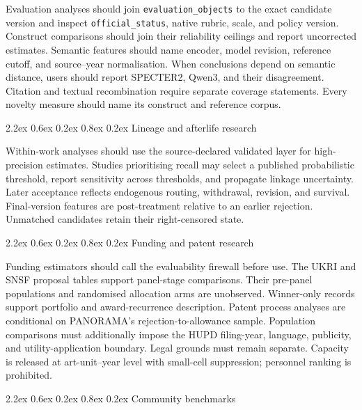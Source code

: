 \documentclass[
  10pt,
]{article}
\makeatletter
\renewcommand\subsection{\@startsection{subsection}{2}{\z@}%
  {2.2ex \@plus 0.6ex \@minus 0.2ex}%
  {0.8ex \@plus 0.2ex}%
  {\normalfont\large\sffamily\bfseries\color{OSGInk}}}
\makeatother
\begin{document}
Evaluation analyses should join \texttt{evaluation\_\allowbreak objects} to the
exact candidate version and inspect \texttt{official\_\allowbreak status}, native
rubric, scale, and policy version. Construct comparisons should join
their reliability ceilings and report uncorrected estimates. Semantic
features should name encoder, model revision, reference cutoff, and
source--year normalisation. When conclusions depend on semantic
distance, users should report SPECTER2, Qwen3, and their disagreement.
Citation and textual recombination require separate coverage
statements. Every novelty measure should name its construct and
reference corpus.

\subsection{Lineage and afterlife
research}\label{83-lineage-and-afterlife-research}

Within-work analyses should use the source-declared validated layer for
high-precision estimates. Studies prioritising recall may select a
published probabilistic threshold, report sensitivity across thresholds,
and propagate linkage uncertainty. Later acceptance reflects endogenous
routing, withdrawal, revision, and survival. Final-version features are
post-treatment relative to an earlier rejection. Unmatched candidates
retain their right-censored state.

\subsection{Funding and patent
research}\label{84-funding-and-patent-research}

Funding estimators should call the evaluability firewall before use.
The UKRI and SNSF proposal tables support panel-stage comparisons. Their
pre-panel populations and randomised allocation arms are unobserved.
Winner-only records support portfolio and award-recurrence description.
Patent process analyses are
conditional on PANORAMA's rejection-to-allowance sample. Population
comparisons must additionally impose the HUPD filing-year, language,
publicity, and utility-application boundary. Legal grounds must remain
separate. Capacity is released at art-unit--year level with small-cell
suppression; personnel ranking is prohibited.

\subsection{Community benchmarks}\label{85-community-benchmarks}
\end{document}
